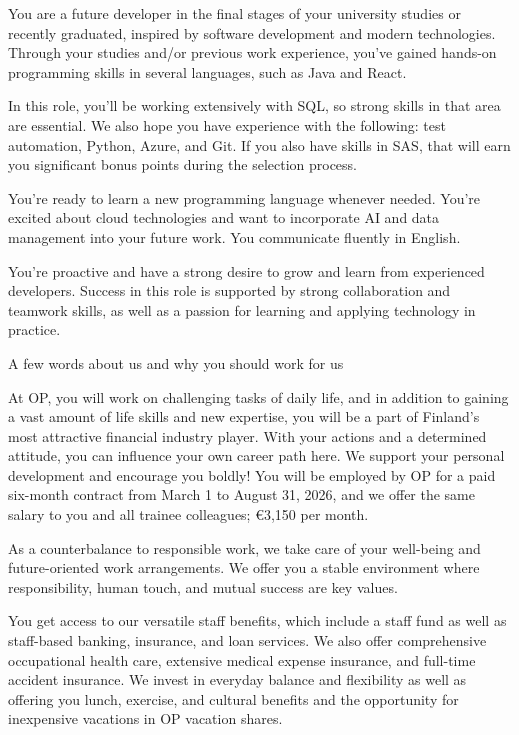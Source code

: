 \documentclass[a4paper,11pt]{article}
\begin{document}
You are a future developer in the final stages of your university studies or recently graduated, inspired by software development and modern technologies. Through your studies and/or previous work experience, you've gained hands-on programming skills in several languages, such as Java and React.

In this role, you'll be working extensively with SQL, so strong skills in that area are essential. We also hope you have experience with the following: test automation, Python, Azure, and Git. If you also have skills in SAS, that will earn you significant bonus points during the selection process.

You're ready to learn a new programming language whenever needed. You're excited about cloud technologies and want to incorporate AI and data management into your future work. You communicate fluently in English.

You're proactive and have a strong desire to grow and learn from experienced developers. Success in this role is supported by strong collaboration and teamwork skills, as well as a passion for learning and applying technology in practice. 

A few words about us and why you should work for us

At OP, you will work on challenging tasks of daily life, and in addition to gaining a vast amount of life skills and new expertise, you will be a part of Finland's most attractive financial industry player.  With your actions and a determined attitude, you can influence your own career path here. We support your personal development and encourage you boldly! You will be employed by OP for a paid six-month contract from March 1 to August 31, 2026, and we offer the same salary to you and all trainee colleagues; €3,150 per month.

As a counterbalance to responsible work, we take care of your well-being and future-oriented work arrangements. We offer you a stable environment where responsibility, human touch, and mutual success are key values.

You get access to our versatile staff benefits, which include a staff fund as well as staff-based banking, insurance, and loan services. We also offer comprehensive occupational health care, extensive medical expense insurance, and full-time accident insurance. We invest in everyday balance and flexibility as well as offering you lunch, exercise, and cultural benefits and the opportunity for inexpensive vacations in OP vacation shares.
\end{document}
